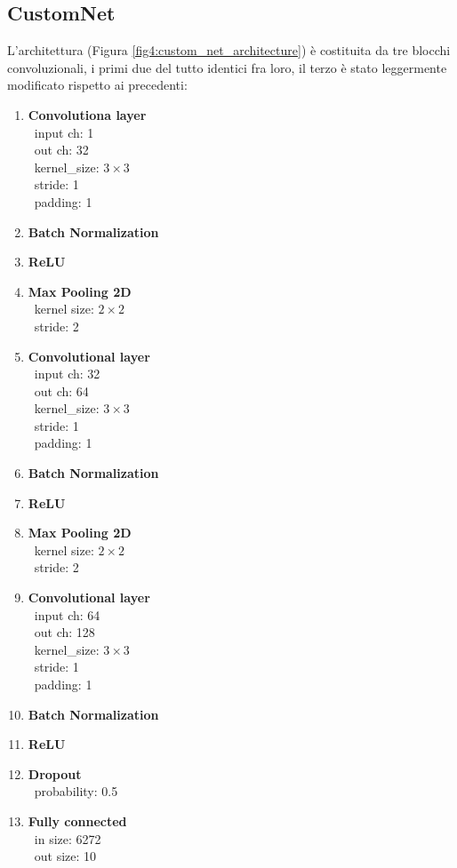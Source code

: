 \subsection*{CustomNet}
L'architettura (Figura \ref{fig4:custom_net_architecture}) è costituita da tre blocchi convoluzionali, i primi due del tutto identici fra loro, il terzo è stato leggermente modificato rispetto  ai precedenti:
\begin{enumerate}
\item \textbf{Convolutiona layer}\\
\-\ input ch: 1\\ \-\ out ch: 32\\ \-\ kernel_size: $3\times3$\\ \-\ stride: 1\\ \-\ padding: 1
\item \textbf{Batch Normalization}
\item \textbf{ReLU}
\item \textbf{Max Pooling 2D}\\
\-\ kernel size: $2\times2$\\ \-\ stride: 2

\item \textbf{Convolutional layer}\\
\-\ input ch: 32\\ \-\ out ch: 64\\ \-\ kernel_size: $3\times3$\\ \-\ stride: 1\\ \-\ padding: 1
\item \textbf{Batch Normalization}
\item \textbf{ReLU}
\item \textbf{Max Pooling 2D}\\
\-\ kernel size: $2\times2$\\ \-\ stride: 2

\item \textbf{Convolutional layer}\\
\-\ input ch: 64\\ \-\ out ch: 128\\ \-\ kernel_size: $3\times3$\\ \-\ stride: 1\\ \-\ padding: 1
\item \textbf{Batch Normalization}
\item \textbf{ReLU}
\item \textbf{Dropout}\\
\-\ probability: 0.5
\item \textbf{Fully connected}\\
\-\ in size: 6272\\ \-\ out size: 10
\end{enumerate}
